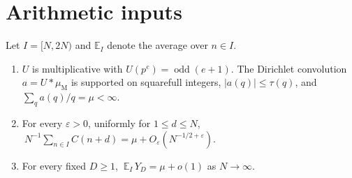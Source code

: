 \documentclass[11pt]{article}
\newcommand{\Av}{\mathbb E}
\begin{document}
\section{Arithmetic inputs}\label{sec:inputs}

\begin{proposition}\label{prop:tail}
Let $I=[N,2N)$ and $\Av_I$ denote the average over $n\in I$.
\begin{enumerate}[label=(\alph*)]
\item $U$ is multiplicative with $U(p^e)=\operatorname{odd}(e+1)$. The Dirichlet convolution $a=U*\mu_{\mathrm M}$ is supported on squarefull integers, $|a(q)|\le\tau(q)$, and $\sum_qa(q)/q=\mu<\infty$.
\item For every $\varepsilon>0$, uniformly for $1\le d\le N$,
$\ N^{-1}\sum_{n\in I}C(n+d)=\mu+O_\varepsilon(N^{-1/2+\varepsilon})$.
\item For every fixed $D\ge1$, $\ \Av_I\,Y_D=\mu+o(1)$ as $N\to\infty$.
\end{enumerate}
\end{proposition}
\end{document}
